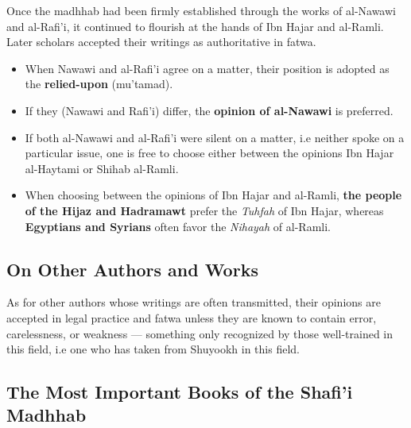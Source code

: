 \documentclass[
  a4paper,
  DIV=11,
  numbers=noendperiod]{scrartcl}
\providecommand{\tightlist}{%
  \setlength{\itemsep}{0pt}\setlength{\parskip}{0pt}}
\begin{document}
\begin{tcolorbox}[enhanced jigsaw, breakable, titlerule=0mm, toprule=.15mm, colframe=quarto-callout-note-color-frame, opacityback=0, title=\textcolor{quarto-callout-note-color}{\faInfo}\hspace{0.5em}{The Authority of Ibn Hajar and al-Ramli}, colback=white, rightrule=.15mm, colbacktitle=quarto-callout-note-color!10!white, bottomtitle=1mm, toptitle=1mm, arc=.35mm, leftrule=.75mm, bottomrule=.15mm, coltitle=black, left=2mm, opacitybacktitle=0.6]

Once the madhhab had been firmly established through the works of
al-Nawawi and al-Rafi'i, it continued to flourish at the hands of Ibn
Hajar and al-Ramli. Later scholars accepted their writings as
authoritative in fatwa.

\begin{itemize}
\tightlist
\item
  When Nawawi and al-Rafi'i agree on a matter, their position is adopted
  as the \textbf{relied-upon} (mu'tamad).
\item
  If they (Nawawi and Rafi'i) differ, the \textbf{opinion of al-Nawawi}
  is preferred.
\item
  If both al-Nawawi and al-Rafi'i were silent on a matter, i.e neither
  spoke on a particular issue, one is free to choose either between the
  opinions Ibn Hajar al-Haytami or Shihab al-Ramli.
\item
  When choosing between the opinions of Ibn Hajar and al-Ramli,
  \textbf{the people of the Hijaz and Hadramawt} prefer the
  \emph{Tuhfah} of Ibn Hajar, whereas \textbf{Egyptians and Syrians}
  often favor the \emph{Nihayah} of al-Ramli.
\end{itemize}

\end{tcolorbox}

\subsection{On Other Authors and
Works}\label{on-other-authors-and-works}

As for other authors whose writings are often transmitted, their
opinions are accepted in legal practice and fatwa unless they are known
to contain error, carelessness, or weakness --- something only
recognized by those well-trained in this field, i.e one who has taken
from Shuyookh in this field.

\subsection{The Most Important Books of the Shafi'i
Madhhab}\label{the-most-important-books-of-the-shafii-madhhab}
\end{document}
